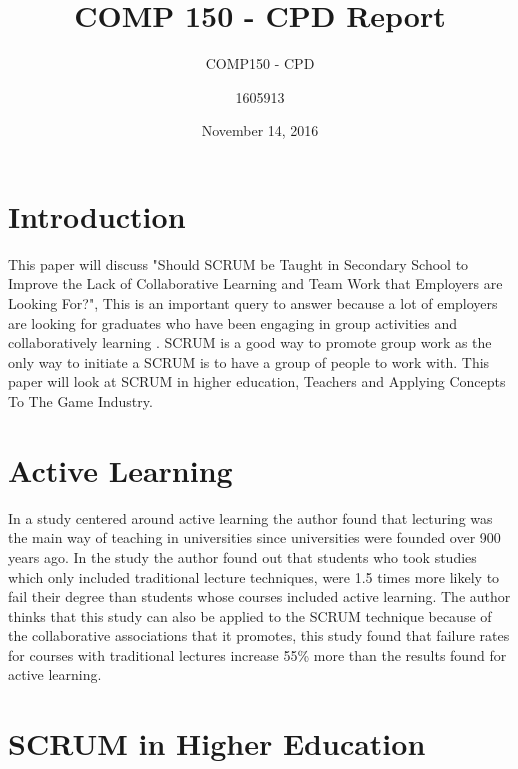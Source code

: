 \documentclass[11pt]{scrartcl}
\title{COMP 150 - CPD Report}
\date{November 14, 2016}
\subtitle{COMP150 - CPD}
\author{1605913}
\begin{document}
\maketitle



\section{Introduction}

This paper will discuss "Should SCRUM be Taught in Secondary School to Improve the Lack of Collaborative Learning and Team Work that Employers are Looking For?", This is an important query to answer because a lot of employers are looking for graduates who have been engaging in group activities and collaboratively learning \cite{hansen2006benefits}. SCRUM is a good way to promote group work as the only way to initiate a SCRUM is to have a group of people to work with. This paper will look at SCRUM in higher education, Teachers and Applying Concepts To The Game Industry. 

\section{Active Learning}

In a study centered around active learning the author found that lecturing was the main way of teaching in universities since universities were founded over 900 years ago. In the study the author found out that students who took studies which only included traditional lecture techniques, were 1.5  times more likely to fail their degree than students whose courses included active learning\cite{freeman2014active}. The author thinks that this study can also be applied to the SCRUM technique because of the collaborative associations that it promotes, this study found that failure rates for courses with traditional lectures increase 55\% more than the results found for active learning. 

\section{SCRUM in Higher Education}
\end{document}
